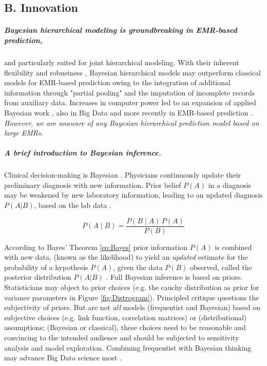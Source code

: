 \documentclass[11pt,notitlepage]{article}
\begin{document}
\subsection*{B. Innovation}

\subparagraph*{Bayesian hierarchical modeling is groundbreaking in EMR-based prediction,} and particularly suited for joint hierarchical modeling. With their inherent flexibility and robustness \cite{Carlin_1349763,Sutton_2012}, Bayesian hierarchical models may outperform classical models for EMR-based prediction owing to the integration of additional information through "partial pooling" \cite{Gelman_red_2009} and the imputation of incomplete records from auxiliary data. Increases in computer power led to an expansion of applied Bayesian work \cite{Ashby_16947924,Spiegelhalter_11134920}, also in Big Data \cite{Efron_largescale_2013,Yoo_24987556} and more recently in EMR-based prediction \cite{Himes_19261943,Ryynaenen_23496851,Wu_20473190}. \textit{However, we are unaware of any Bayesian hierarchical prediction model based on large EMRs.} 

\subparagraph{A brief introduction to Bayesian inference.} Clinical decision-making is Bayesian \cite{Spiegelhalter_11134920}. Physicians continuously update their preliminary diagnosis with new information. Prior belief $P(A)$ in a diagnosis may be weakened by new laboratory information, leading to an updated diagnosis $P(A|B)$, based on the lab data \cite{Kruschke_22774788, Kruschke_Book_2014}. 
  
\begin{figure}
\vspace{-10pt}
  \begin{equation}
   \label{eq:Bayes}
P(A \mid B) = \frac{P(B \mid A) \, P(A)}{P(B)}
   \end{equation}
   \vspace{-20pt}
\end{figure}

\vspace{5pt} According to Bayes' Theorem \ref{eq:Bayes} prior information $P(A)$ is combined with new data, (known as the likelihood) to yield an \textit{updated} estimate for the probability of a hypothesis $P(A)$, given the data $P(B)$ observed, called the posterior distribution $P(A|B)$ \cite{Thomas_Bayes}. Full Bayesian inference is based on priors. Statisticians may object to prior choices (e.g. the cauchy distribution as prior for variance parameters \cite{Gelman_Cauchy_2006} in Figure \ref{fig:Distrogram}).  Principled critique questions the subjectivity of priors. But are not \textit{all} models (frequentist and Bayesian) based on subjective choices \cite{Wagenmakers_Bayesian_v_Freq_2008} (e.g. link function, correlation matrices) or (distributional) assumptions; (Bayesian or classical), these choices need to be reasonable and convincing to the intended audience and should be subjected to sensitivity analysis and model exploration. Combining frequentist with Bayesian thinking may advance Big Data science most \cite{Efron_Bayes_v_Freqentisit,Efron_largescale_2013}. 
\end{document}
